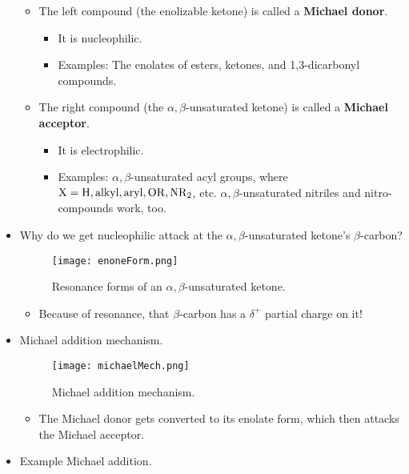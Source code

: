 \documentclass[../notes.tex]{subfiles}
\begin{document}
\begin{itemize}
\begin{itemize}
        \item The left compound (the enolizable ketone) is called a \textbf{Michael donor}.
        \begin{itemize}
            \item It is nucleophilic.
            \item Examples: The enolates of esters, ketones, and 1,3-dicarbonyl compounds.
        \end{itemize}
        \item The right compound (the $\alpha,\beta$-unsaturated ketone) is called a \textbf{Michael acceptor}.
        \begin{itemize}
            \item It is electrophilic.
            \item Examples: $\alpha,\beta$-unsaturated acyl  groups, where $\ce{X}=\ce{H},\text{alkyl},\text{aryl},\ce{OR},\ce{NR2}$, etc. $\alpha,\beta$-unsaturated nitriles and nitro-compounds work, too.
        \end{itemize}
    \end{itemize}
    \item Why do we get nucleophilic attack at the $\alpha,\beta$-unsaturated ketone's $\beta$-carbon?
    \begin{figure}[h!]
        \centering
        \texttt{[image: enoneForm.png]}
        \caption{Resonance forms of an $\alpha,\beta$-unsaturated ketone.}
        \label{fig:enoneForm}
    \end{figure}
    \begin{itemize}
        \item Because of resonance, that $\beta$-carbon has a $\delta^+$ partial charge on it!
    \end{itemize}
    \item Michael addition mechanism.
    \begin{figure}[h!]
        \centering
        \texttt{[image: michaelMech.png]}
        \caption{Michael addition mechanism.}
        \label{fig:michaelMech}
    \end{figure}
    \begin{itemize}
        \item The Michael donor gets converted to its enolate form, which then attacks the Michael acceptor.
    \end{itemize}
    \pagebreak
    \item Example Michael addition.
    \begin{figure}[h!]

\end{figure}
\end{itemize}
\end{document}
